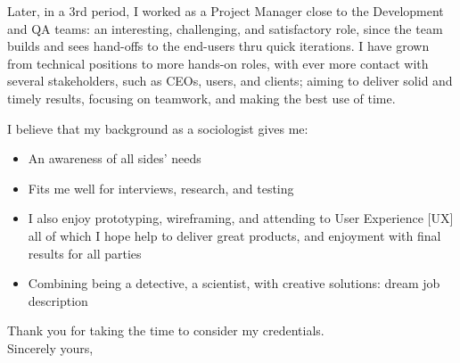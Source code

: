 Later, in a 3rd period, I worked as a Project Manager close to the Development and QA teams:
an interesting, challenging, and satisfactory role, 
since the team builds and sees 
hand-offs to the end-users thru quick iterations.
I have grown from technical positions to more hands-on roles, with ever more contact 
with several stakeholders, such as CEOs, users, and clients; 
aiming to deliver solid and timely results, 
focusing on teamwork, 
and making the best use of time.

I believe that my background 
as a sociologist gives me:

\vspace{-\topsep}
\begin{itemize}
  \setlength{\parskip}{0pt}
  \setlength{\itemsep}{0pt plus 1pt}
 \item An awareness of all sides' needs
 \item Fits me well for interviews, research, and testing
  \item I also enjoy prototyping, wireframing, and attending to User Experience [UX]
all of which I hope help to deliver great products, and enjoyment with final results for all parties
  \item Combining being a detective, a scientist, with creative solutions: dream job description
\end{itemize}
\vspace{-\topsep}


% 

Thank you for taking the time to consider my credentials. \\
\bigskip %
Sincerely yours,

